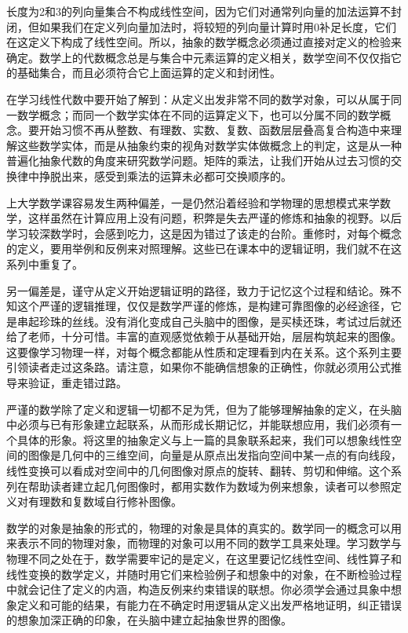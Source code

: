 \songti

长度为2和3的列向量集合不构成线性空间，因为它们对通常列向量的加法运算不封闭，但如果我们在定义列向量加法时，将较短的列向量计算时用0补足长度，它们在这定义下构成了线性空间。所以，抽象的数学概念必须通过直接对定义的检验来确定。数学上的代数概念总是与集合中元素运算的定义相关，数学空间不仅仅指它的基础集合，而且必须符合它上面运算的定义和封闭性。

在学习线性代数中要开始了解到：从定义出发非常不同的数学对象，可以从属于同一数学概念；而同一个数学实体在不同的运算定义下，也可以分属不同的数学概念。要开始习惯不再从整数、有理数、实数、复数、函数层层叠高复合构造中来理解这些数学实体，而是从抽象约束的视角对数学实体做概念上的判定，这是从一种普遍化抽象代数的角度来研究数学问题。矩阵的乘法，让我们开始从过去习惯的交换律中挣脱出来，感受到乘法的运算未必都可交换顺序的。

上大学数学课容易发生两种偏差，一是仍然沿着经验和学物理的思想模式来学数学，这样虽然在计算应用上没有问题，积弊是失去严谨的修炼和抽象的视野。以后学习较深数学时，会感到吃力，这是因为错过了该走的台阶。重修时，对每个概念的定义，要用举例和反例来对照理解。这些已在课本中的逻辑证明，我们就不在这系列中重复了。

另一偏差是，谨守从定义开始逻辑证明的路径，致力于记忆这个过程和结论。殊不知这个严谨的逻辑推理，仅仅是数学严谨的修炼，是构建可靠图像的必经途径，它是串起珍珠的丝线。没有消化变成自己头脑中的图像，是买椟还珠，考试过后就还给了老师，十分可惜。丰富的直观感觉依赖于从基础开始，层层构筑起来的图像。这要像学习物理一样，对每个概念都能从性质和定理看到内在关系。这个系列主要引领读者走过这条路。请注意，如果你不能确信想象的正确性，你就必须用公式推导来验证，重走错过路。

严谨的数学除了定义和逻辑一切都不足为凭，但为了能够理解抽象的定义，在头脑中必须与已有形象建立起联系，从而形成长期记忆，并能联想应用，我们必须有一个具体的形象。将这里的抽象定义与上一篇的具象联系起来，我们可以想象线性空间的图像是几何中的三维空间，向量是从原点出发指向空间中某一点的有向线段，线性变换可以看成对空间中的几何图像对原点的旋转、翻转、剪切和伸缩。这个系列在帮助读者建立起几何图像时，都用实数作为数域为例来想象，读者可以参照定义对有理数和复数域自行修补图像。

数学的对象是抽象的形式的，物理的对象是具体的真实的。数学同一的概念可以用来表示不同的物理对象，而物理的对象可以用不同的数学工具来处理。学习数学与物理不同之处在于，数学需要牢记的是定义，在这里要记忆线性空间、线性算子和线性变换的数学定义，并随时用它们来检验例子和想象中的对象，在不断检验过程中就会记住了定义的内涵，构造反例来约束错误的联想。你必须学会通过具象中想象定义和可能的结果，有能力在不确定时用逻辑从定义出发严格地证明，纠正错误的想象加深正确的印象，在头脑中建立起抽象世界的图像。

